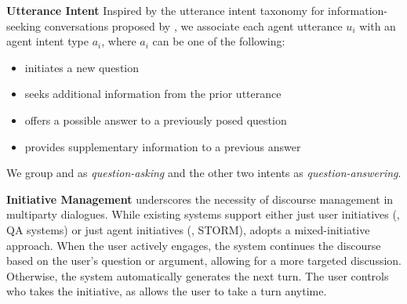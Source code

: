 \noindent
\textbf{Utterance Intent}\quad
Inspired by the utterance intent taxonomy for information-seeking conversations proposed by \citet{Qu_2019}, we associate each agent utterance $u_i$ with an agent intent type $a_i$, where $a_i$ can be one of the following: 
\begin{itemize}
\item
{} initiates a new question 
\item
{} seeks additional information from the prior utterance
\item
{} offers a possible answer to a previously posed question 
\item
{} provides supplementary information to a previous answer
\end{itemize}
We group  and  as \textit{question-asking} and the other two  intents as \textit{question-answering}.


\noindent
\textbf{Initiative Management}\quad
\citet{traum2003issues} underscores the necessity of discourse management in multiparty dialogues. %
While existing systems support either just user initiatives (\eg, QA systems) or just agent initiatives (\eg, STORM), \system adopts a mixed-initiative approach. When the user actively engages, the system continues the discourse based on the user's question or argument, allowing for a more targeted discussion. Otherwise, the system automatically generates the next turn. The user controls who takes the initiative, as \system allows the user to take a turn anytime.

